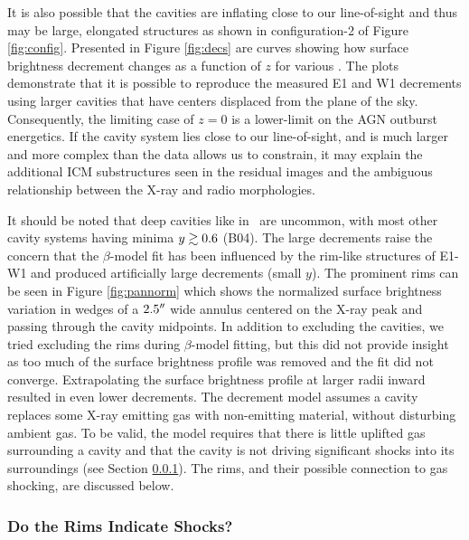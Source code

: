 \documentclass[apjpt4]{aastex}
\begin{document}
It is also possible that the cavities are inflating close to our
line-of-sight and thus may be large, elongated structures as shown in
configuration-2 of Figure \ref{fig:config}. Presented in Figure
\ref{fig:decs} are curves showing how surface brightness decrement
changes as a function of $z$ for various \rlos. The plots demonstrate
that it is possible to reproduce the measured E1 and W1 decrements
using larger cavities that have centers displaced from the plane of
the sky. Consequently, the limiting case of $z = 0$ is a lower-limit
on the AGN outburst energetics. If the cavity system lies close to our
line-of-sight, and is much larger and more complex than the data
allows us to constrain, it may explain the additional ICM
substructures seen in the residual images and the ambiguous
relationship between the X-ray and radio morphologies.

It should be noted that deep cavities like in \rbs\ are uncommon, with
most other cavity systems having minima $y \gtrsim 0.6$ (B04). The large
decrements raise the concern that the $\beta$-model fit has been
influenced by the rim-like structures of E1-W1 and produced
artificially large decrements (small $y$). The prominent rims can be
seen in Figure \ref{fig:pannorm} which shows the normalized surface
brightness variation in wedges of a $2.5\rm{^\prime}\hskip -0.1em\rm{^\prime}$ wide annulus centered
on the X-ray peak and passing through the cavity midpoints. In
addition to excluding the cavities, we tried excluding the rims during
$\beta$-model fitting, but this did not provide insight as too much of
the surface brightness profile was removed and the fit did not
converge. Extrapolating the surface brightness profile at larger radii
inward resulted in even lower decrements. The \citet{hydraa} decrement
model assumes a cavity replaces some X-ray emitting gas with
non-emitting material, without disturbing ambient gas. To be valid,
the model requires that there is little uplifted gas surrounding a
cavity \citep[\cf][]{2005ApJ...628..629N, 2001ApJ...558L..15B} and
that the cavity is not driving significant shocks into its
surroundings (see Section \ref{sec:shocks}). The rims, and their
possible connection to gas shocking, are discussed below.

\subsubsection{Do the Rims Indicate Shocks?}
\label{sec:shocks}
\end{document}
